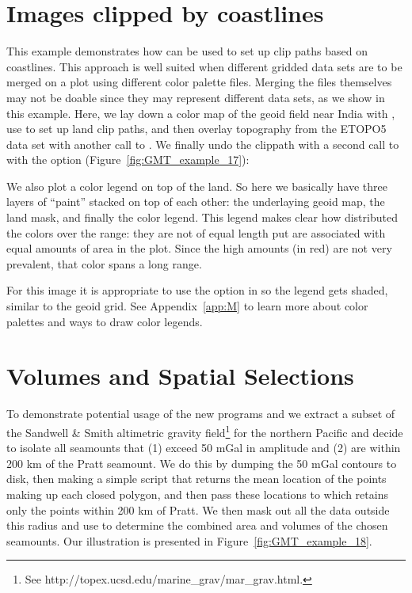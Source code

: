 

\section{Images clipped by coastlines}

This example demonstrates how  can be used
to set up clip paths based on coastlines.  This approach
is well suited when different gridded data sets are to be
merged on a plot using different color palette files.
Merging the files themselves may not be doable since they
may represent different data sets, as we show in this example.
Here, we lay down a color map of the geoid field near India
with , use  to set up land
clip paths, and then overlay topography from the ETOPO5 data
set with another call to .  We finally undo
the clippath with a second call to  with the
option  (Figure~\ref{fig:GMT_example_17}): 


We also plot a color legend on top of the land. So here we basically have three
layers of ``paint'' stacked on top of each other: the underlaying geoid map,
the land mask, and finally the color legend. This legend makes clear how
 distributed the colors over the range: they are not of equal
length put are associated with equal amounts of area in the plot. Since the high
amounts (in red) are not very prevalent, that color spans a long range.

For this image it is appropriate to use the  option in 
so the legend gets shaded, similar to the geoid grid.
See Appendix~\ref{app:M} to learn more about color palettes and ways to draw color legends.


\section{Volumes and Spatial Selections}

To demonstrate potential usage of the new programs
 and  we extract a subset
of the Sandwell \& Smith altimetric gravity field\footnote{
See http://topex.ucsd.edu/marine\_grav/mar\_grav.html.}
for the northern Pacific and decide to isolate all seamounts that
(1) exceed 50 mGal in amplitude and (2) are within 200 km
of the Pratt seamount.  We do this by dumping the 50 mGal
contours to disk, then making a simple  script
 that returns the mean location of the points
making up each closed polygon, and then pass these locations
to  which retains only the points within 200
km of Pratt.  We then mask out all the data outside this
radius and use  to determine the combined
area and volumes of the chosen seamounts.
Our illustration is presented in Figure~\ref{fig:GMT_example_18}.

